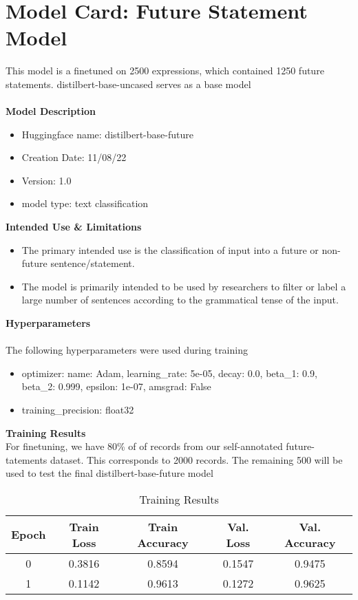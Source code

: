 \section{Model Card: Future Statement Model}
This model is a finetuned on 2500 expressions, which contained 1250 future statements. distilbert-base-uncased serves as a base model
\\
\\
%
\textbf{Model Description}
%
\begin{itemize}
    \item Huggingface name: distilbert-base-future
    \item Creation Date: 11/08/22
    \item Version: 1.0
    \item model type: text classification
\end{itemize}%
%
\textbf{Intended Use \& Limitations}
%
\begin{itemize}
    \item The primary intended use is the classification of input into a future or non-future sentence/statement.
    \item The model is primarily intended to be used by researchers to filter or label a large number of sentences according to the grammatical tense of the input.
\end{itemize}%
%
\textbf{Hyperparameters}
\\
\\
The following hyperparameters were used during training
\begin{itemize}
    \item optimizer:
    name: Adam, learning\_rate: 5e-05, decay: 0.0, beta\_1: 0.9, beta\_2: 0.999, epsilon: 1e-07, amsgrad: False
    \item training\_precision: float32
\end{itemize}%
\label{sec:appendix}
%
\textbf{Training Results}
\\
For finetuning, we have 80\% of of records from our self-annotated future-tatements dataset. This corresponds to 2000 records.
The remaining 500 will be used to test the final distilbert-base-future model
\\
\begin{table}[ht]
    \scriptsize
    \setlength\tabcolsep{10pt} %
    \footnotesize\centering
    \begin{tabular}{ccccc}
        \toprule
        \textbf{Epoch} & \textbf{Train Loss} & \textbf{Train Accuracy} & \textbf{Val. Loss} & \textbf{Val. Accuracy} \\
        \midrule
        0 & 0.3816 & 0.8594 & 0.1547 & 0.9475 \\
        1 & 0.1142 & 0.9613 & 0.1272 & 0.9625 \\
        \bottomrule
    \end{tabular}
    \caption{\label{future-model-train}
    Training Results
    }
\end{table}
